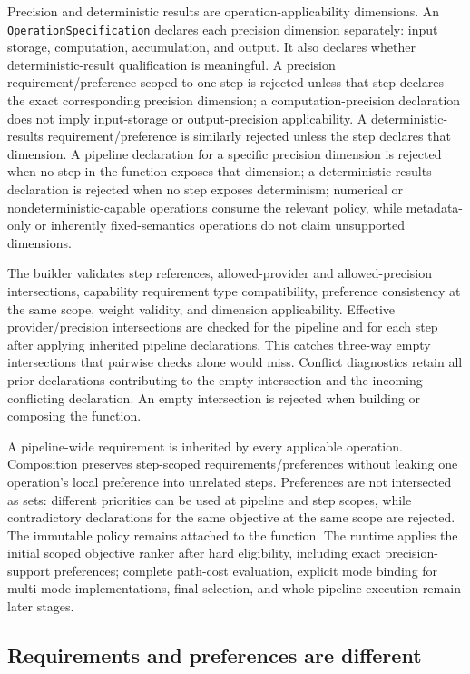 \documentclass[11pt,a4paper,oneside]{article}
\begin{document}
Precision and deterministic results are operation-applicability dimensions. An \texttt{OperationSpecification} declares each precision dimension separately: input storage, computation, accumulation, and output. It also declares whether deterministic-result qualification is meaningful. A precision requirement/preference scoped to one step is rejected unless that step declares the exact corresponding precision dimension; a computation-precision declaration does not imply input-storage or output-precision applicability. A deterministic-results requirement/preference is similarly rejected unless the step declares that dimension. A pipeline declaration for a specific precision dimension is rejected when no step in the function exposes that dimension; a deterministic-results declaration is rejected when no step exposes determinism; numerical or nondeterministic-capable operations consume the relevant policy, while metadata-only or inherently fixed-semantics operations do not claim unsupported dimensions.

The builder validates step references, allowed-provider and allowed-precision intersections, capability requirement type compatibility, preference consistency at the same scope, weight validity, and dimension applicability. Effective provider/precision intersections are checked for the pipeline and for each step after applying inherited pipeline declarations. This catches three-way empty intersections that pairwise checks alone would miss. Conflict diagnostics retain all prior declarations contributing to the empty intersection and the incoming conflicting declaration. An empty intersection is rejected when building or composing the function.

A pipeline-wide requirement is inherited by every applicable operation. Composition preserves step-scoped requirements/preferences without leaking one operation's local preference into unrelated steps. Preferences are not intersected as sets: different priorities can be used at pipeline and step scopes, while contradictory declarations for the same objective at the same scope are rejected. The immutable policy remains attached to the function. The runtime applies the initial scoped objective ranker after hard eligibility, including exact precision-support preferences; complete path-cost evaluation, explicit mode binding for multi-mode implementations, final selection, and whole-pipeline execution remain later stages.

\subsection{Requirements and preferences are different}
\end{document}
